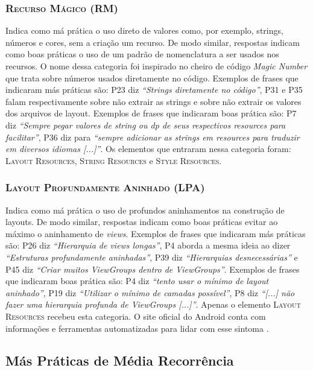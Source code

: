 \subsubsection{\textsc{Recurso Mágico (RM)}}
Indica como má prática o uso direto de valores como, por exemplo, strings, números e cores, sem a criação um recurso. De modo similar, respostas indicam como boas práticas o uso de um padrão de nomenclatura a ser usados nos recursos. O nome dessa categoria foi inspirado no cheiro de código \textit{Magic Number} \cite{Martin:2008:CCH:1388398} que trata sobre números usados diretamente no código. Exemplos de frases que indicaram más práticas são: P23 diz \textit{``Strings diretamente no código''}, P31 e P35 falam respectivamente sobre não extrair as strings e sobre não extrair os valores dos arquivos de layout. Exemplos de frases que indicaram boas prática são: P7 diz \textit{``Sempre pegar valores de string ou dp de seus respectivos resources para facilitar''}, P36 diz para \textit{``sempre adicionar as strings em resources para traduzir em diversos idiomas [...]''}. Os elementos que entraram nessa categoria foram: \textsc{Layout Resources}, \textsc{String Resources} e \textsc{Style Resources}. 


\subsubsection{\textsc{Layout Profundamente Aninhado (LPA)}} 
Indica como má prática o uso de profundos aninhamentos na construção de layouts. De modo similar, respostas indicam como boas práticas evitar ao máximo o aninhamento de \textit{views}. Exemplos de frases que indicaram más práticas são: P26 diz \textit{``Hierarquia de views longas''}, P4 aborda a mesma ideia ao dizer \textit{``Estruturas profundamente aninhadas''}, P39 diz \textit{``Hierarquias desnecessárias''} e P45 diz \textit{``Criar muitos ViewGroups dentro de ViewGroups''}. Exemplos de frases que indicaram boas prática são: P4 diz \textit{``tento usar o mínimo de layout aninhado''}, P19 diz \textit{``Utilizar o mínimo de camadas possível''}, P8 diz \textit{``[...] não fazer uma hierarquia profunda de ViewGroups [...]''}. Apenas o elemento \textsc{Layout Resources} recebeu esta categoria. O site oficial do Android conta com informações e ferramentas automatizadas para lidar com esse sintoma \cite{OptmizingViewHierarchies}. 


\subsection{Más Práticas de Média Recorrência}

